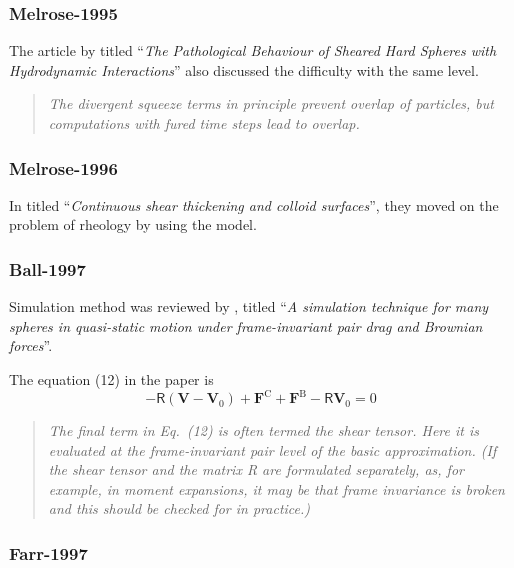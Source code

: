 \documentclass[12pt]{article}
\newcommand{\tens}[1]{\bm{\mathsf{#1}}}
\begin{document}
\subsubsection*{Melrose-1995}

The article by \citet{Melrose_1995}
titled ``\emph{The Pathological Behaviour of Sheared Hard Spheres with Hydrodynamic Interactions}'' also discussed the difficulty with the same level.

\begin{quote}
\emph{The divergent squeeze terms in principle prevent overlap of particles,
 but computations with fured time steps lead to overlap. }
\end{quote}

\subsubsection*{Melrose-1996}

In \citet{Melrose_1996}
titled ``\emph{Continuous shear thickening and colloid surfaces}'',
they moved on the problem of rheology 
by using the model.  



\subsubsection*{Ball-1997}

Simulation method was reviewed  
by \citet{Ball_1997},
titled 
``\emph{A simulation technique for many spheres 
in quasi-static motion under frame-invariant pair drag and Brownian forces}''.

The equation (12) in the paper is 
\begin{equation}
 - \tens{R} (\bm{V}-\bm{V}_0)
 + \bm{F}^{\mathrm{C}}
 + \bm{F}^{\mathrm{B}}
 - \tens{R} \bm{V}_0 = 0
\end{equation}

\begin{quotation}
\emph{
 The final term in Eq.~(12) is often termed the shear tensor. 
Here it is evaluated at the frame-invariant pair level of the basic approximation. 
(If the shear tensor and the matrix R are formulated separately,
 as, for example, in moment expansions, 
it may be that frame invariance is broken and this should be checked for in practice.)
}
\end{quotation}

\subsubsection*{Farr-1997}
\end{document}
